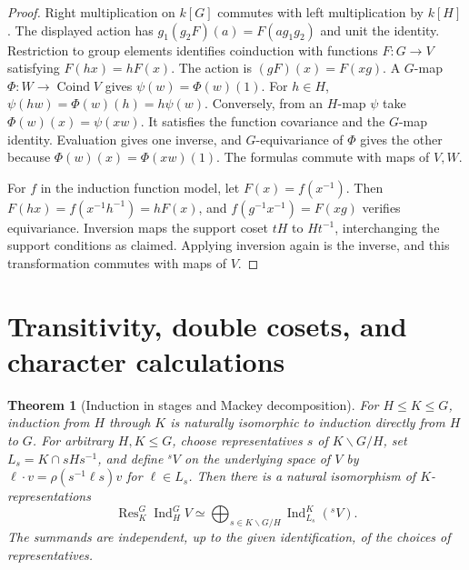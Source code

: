 \documentclass[11pt,oneside,openany]{book}
\newtheorem{theorem}{Theorem}[chapter]
\theoremstyle{definition}
\theoremstyle{remark}
\begin{document}
\begin{proof}
Right multiplication on \(k[G]\) commutes with left multiplication
by \(k[H]\). The displayed action has \(g_1(g_2F)(a)=F(ag_1g_2)\)
and unit the identity. Restriction to group elements identifies
coinduction with functions \(F:G\to V\) satisfying
\(F(hx)=hF(x)\). The action is \((gF)(x)=F(xg)\).
A \(G\)-map \(\Phi:W\to\operatorname{Coind} V\) gives
\(\psi(w)=\Phi(w)(1)\). For \(h\in H\),
\(\psi(hw)=\Phi(w)(h)=h\psi(w)\). Conversely, from an \(H\)-map
\(\psi\) take \(\Phi(w)(x)=\psi(xw)\). It satisfies the function
covariance and the \(G\)-map identity. Evaluation gives one
inverse, and \(G\)-equivariance of \(\Phi\) gives the other
because \(\Phi(w)(x)=\Phi(xw)(1)\). The formulas commute with
maps of \(V,W\).

For \(f\) in the induction function model, let \(F(x)=f(x^{-1})\).
Then \(F(hx)=f(x^{-1}h^{-1})=hF(x)\), and
\(f(g^{-1}x^{-1})=F(xg)\) verifies equivariance. Inversion maps
the support coset \(tH\) to \(Ht^{-1}\), interchanging the
support conditions as claimed. Applying inversion again is the
inverse, and this transformation commutes with maps of \(V\).
\end{proof}

\section{Transitivity, double cosets, and character calculations}

\begin{theorem}[Induction in stages and Mackey decomposition]
\label{p103:ALG-07-C03-R03}
For \(H\le K\le G\), induction from \(H\) through \(K\) is
naturally isomorphic to induction directly from \(H\) to \(G\).
For arbitrary \(H,K\le G\), choose representatives \(s\) of
\(K\backslash G/H\), set \(L_s=K\cap sHs^{-1}\), and define
\({}^{s}V\) on the underlying space of \(V\) by
\(\ell\cdot v=\rho(s^{-1}\ell s)v\) for \(\ell\in L_s\).
Then there is a natural isomorphism of \(K\)-representations
\[
 \operatorname{Res}_K^G \operatorname{Ind}_H^G V
 \simeq
 \bigoplus_{s\in K\backslash G/H}\operatorname{Ind}_{L_s}^K({}^{s}V).
\]
The summands are independent, up to the given identification,
of the choices of representatives.
\end{theorem}
\end{document}
